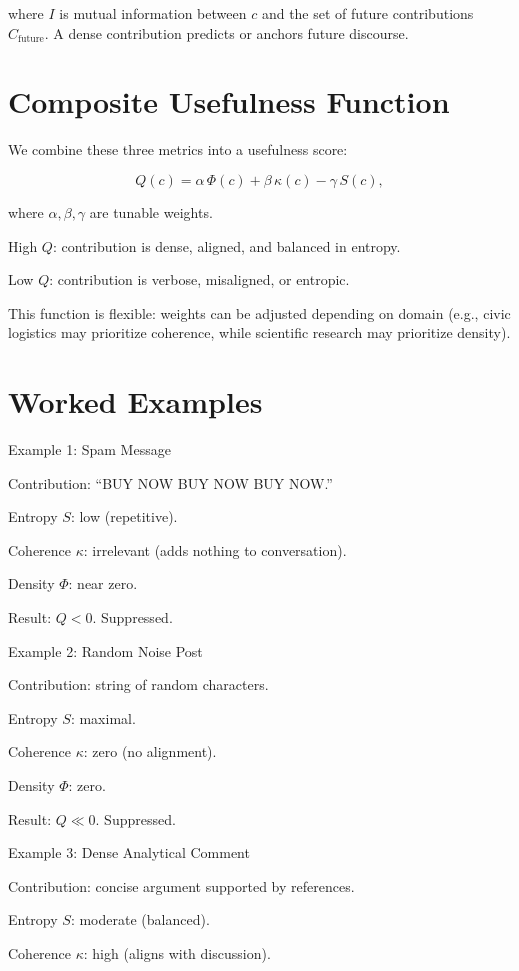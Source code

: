 \documentclass{book}
\begin{document}
where \( I \) is mutual information between \( c \) and the set of future contributions \( C_{\text{future}} \). A dense contribution predicts or anchors future discourse.

\section{Composite Usefulness Function}

We combine these three metrics into a usefulness score:

\[ Q(c) = \alpha \, \Phi(c) + \beta \, \kappa(c) - \gamma \, S(c), \]

where \( \alpha, \beta, \gamma \) are tunable weights.

High \( Q \): contribution is dense, aligned, and balanced in entropy.

Low \( Q \): contribution is verbose, misaligned, or entropic.

This function is flexible: weights can be adjusted depending on domain (e.g., civic logistics may prioritize coherence, while scientific research may prioritize density).

\section{Worked Examples}

Example 1: Spam Message

Contribution: “BUY NOW BUY NOW BUY NOW.”

Entropy \( S \): low (repetitive).

Coherence \( \kappa \): irrelevant (adds nothing to conversation).

Density \( \Phi \): near zero.

Result: \( Q < 0 \). Suppressed.

Example 2: Random Noise Post

Contribution: string of random characters.

Entropy \( S \): maximal.

Coherence \( \kappa \): zero (no alignment).

Density \( \Phi \): zero.

Result: \( Q \ll 0 \). Suppressed.

Example 3: Dense Analytical Comment

Contribution: concise argument supported by references.

Entropy \( S \): moderate (balanced).

Coherence \( \kappa \): high (aligns with discussion).
\end{document}
